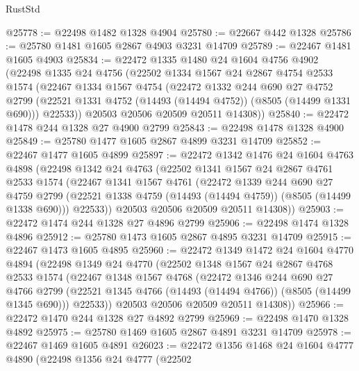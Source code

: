 \begin{lexlean}{RustStd}
\begin{coremodule}
@25778 := @22498 @1482 @1328 @4904
@25780 := @22667 @442 @1328
@25786 := @25780 @1481 @1605 @2867 @4903 @3231 @14709
@25789 := @22467 @1481 @1605 @4903
@25834 := @22472
    @1335
    @1480
    @24
    @1604
    @4756
    @4902
    (@22498
      @1335
      @24
      @4756
      (@22502
        @1334
        @1567
        @24
        @2867
        @4754
        @2533
        @1574
        (@22467
          @1334
          @1567
          @4754
          (@22472
            @1332
            @244
            @690
            @27
            @4752
            @2799
            (@22521 @1331 @4752 (@14493 (@14494 @4752)) (@8505 (@14499 @1331 @690)))
            @22533))
        @20503
        @20506
        @20509
        @20511
        @14308))
@25840 := @22472 @1478 @244 @1328 @27 @4900 @2799
@25843 := @22498 @1478 @1328 @4900
@25849 := @25780 @1477 @1605 @2867 @4899 @3231 @14709
@25852 := @22467 @1477 @1605 @4899
@25897 := @22472
    @1342
    @1476
    @24
    @1604
    @4763
    @4898
    (@22498
      @1342
      @24
      @4763
      (@22502
        @1341
        @1567
        @24
        @2867
        @4761
        @2533
        @1574
        (@22467
          @1341
          @1567
          @4761
          (@22472
            @1339
            @244
            @690
            @27
            @4759
            @2799
            (@22521 @1338 @4759 (@14493 (@14494 @4759)) (@8505 (@14499 @1338 @690)))
            @22533))
        @20503
        @20506
        @20509
        @20511
        @14308))
@25903 := @22472 @1474 @244 @1328 @27 @4896 @2799
@25906 := @22498 @1474 @1328 @4896
@25912 := @25780 @1473 @1605 @2867 @4895 @3231 @14709
@25915 := @22467 @1473 @1605 @4895
@25960 := @22472
    @1349
    @1472
    @24
    @1604
    @4770
    @4894
    (@22498
      @1349
      @24
      @4770
      (@22502
        @1348
        @1567
        @24
        @2867
        @4768
        @2533
        @1574
        (@22467
          @1348
          @1567
          @4768
          (@22472
            @1346
            @244
            @690
            @27
            @4766
            @2799
            (@22521 @1345 @4766 (@14493 (@14494 @4766)) (@8505 (@14499 @1345 @690)))
            @22533))
        @20503
        @20506
        @20509
        @20511
        @14308))
@25966 := @22472 @1470 @244 @1328 @27 @4892 @2799
@25969 := @22498 @1470 @1328 @4892
@25975 := @25780 @1469 @1605 @2867 @4891 @3231 @14709
@25978 := @22467 @1469 @1605 @4891
@26023 := @22472
    @1356
    @1468
    @24
    @1604
    @4777
    @4890
    (@22498
      @1356
      @24
      @4777
      (@22502

\end{coremodule}
\end{lexlean}
